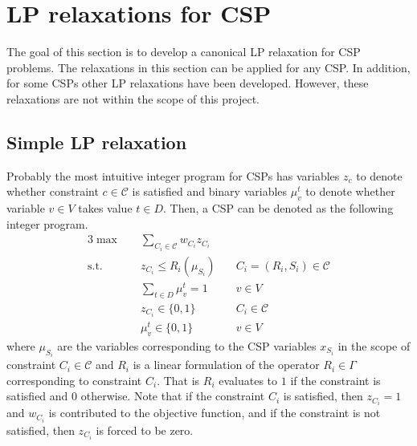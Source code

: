 \section{LP relaxations for CSP}
The goal of this section is to develop a canonical LP relaxation for CSP problems. The relaxations in this section can be applied for any CSP. 
In addition, for some CSPs other LP relaxations have been developed. However, these relaxations are not within the scope of this project.

\subsection{Simple LP relaxation}
Probably the most intuitive integer program for CSPs has variables $z_c$ to denote whether constraint $c \in \mathcal{C}$ is satisfied and binary variables $\mu_v^t$ to denote whether variable $v \in V$ takes value $t \in D$. 
Then, a CSP can be denoted as the following integer program.
\begin{alignat}{3}
	\max \quad & \sum_{C_i \in \mathcal{C}}w_{C_i} z_{C_i} & \label{eq:lp_weak}\\
	\text{s.t.} \quad & z_{C_i} \le R_{i}( \mu_{S_i} ) & \quad C_i = (R_i, S_i) \in \mathcal{C} \nonumber \\
	& \sum_{t \in D} \mu_v^t = 1 & \quad v \in V \nonumber\\
	& z_{C_i} \in \{0,1\} & \quad {C_i} \in \mathcal{C} \nonumber\\
	&	\mu_v^t \in \{0,1\}	& \quad v \in  V \nonumber
\end{alignat}
where $\mu_{S_i}$ are the variables corresponding to the CSP variables $x_{S_i}$ in the scope of constraint ${C_i} \in \mathcal{C}$ and $R_i$ is a linear formulation of the operator $R_i \in \Gamma$ corresponding to constraint $C_i$. 
That is $R_i$ evaluates to $1$ if the constraint is satisfied and $0$ otherwise. 
Note that if the constraint ${C_i}$ is satisfied, then $z_{C_i} = 1$ and $w_{C_i}$ is contributed to the objective function, and if the constraint is not satisfied, then $z_{C_i}$ is forced to be zero. 

